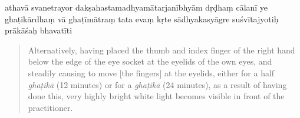 \begin{itquote}
  \begin{ekdosis}
athavā svanetrayor
dakṣahastamadhyamātarjanībhyām
dṛḍhaṃ cālanī ye ghaṭikārdhaṃ vā ghaṭīmātraṃ tata  evaṃ kṛte sādhyakasyāgre suśvītajyotiḥ prākāśaḥ
bhavatīti \normalpipe
{}
\end{ekdosis}
\end{itquote}

\begin{quote}
Alternatively, having placed the thumb and index finger of the right hand below the edge of the eye socket at the eyelids of the own eyes, and steadily causing to move [the fingers] at the eyelids, either for a half \textit{ghaṭikā} (12 minutes) or for a \textit{ghaṭikā} (24 minutes), as a result of having done this, very highly bright white light becomes visible in front of the practitioner.
\end{quote}

